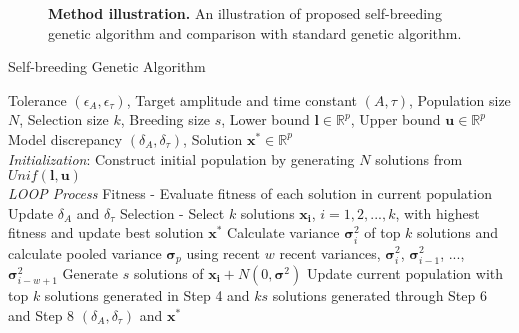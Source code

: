 \documentclass[10pt,letterpaper]{article}
\begin{document}
\begin{figure}[!ht]
    \centering
    \caption{{\bf Method illustration.} 
    An illustration of proposed self-breeding genetic algorithm and comparison with standard genetic algorithm.}
    \label{fig5}
\end{figure}

\begin{algorithm}[!ht]
    \caption{Self-breeding Genetic Algorithm}
    \begin{algorithmic}[1-=0+-*]
        \renewcommand{\algorithmicrequire}{\textbf{Input:}}
        \renewcommand{\algorithmicensure}{\textbf{Output:}}
        \REQUIRE Tolerance $(\epsilon_{A}, \epsilon_{\tau})$, Target amplitude and time constant $(A, \tau)$, Population size $N$, Selection size $k$, Breeding size $s$, Lower bound $\mathbf{l} \in \mathbb{R}^p$, Upper bound $\mathbf{u} \in \mathbb{R}^p$
        \ENSURE Model discrepancy $(\delta_{A}, \delta_{\tau})$, Solution $\mathbf{x}^* \in \mathbb{R}^p$
        \\ \textit{Initialization}:
        \STATE Construct initial population by generating $N$ solutions from $Unif(\mathbf{l}, \mathbf{u})$
        \\ \textit{LOOP Process}
        \STATE Fitness - Evaluate fitness of each solution in current population        
        \STATE Update $\delta_{A}$ and $\delta_{\tau}$
        \STATE Selection - Select $k$ solutions $\mathbf{x_i}$, $i=1,2,...,k$, with highest fitness and update best solution $\mathbf{x^{*}}$
        \STATE Calculate variance $\mathbf{\sigma}^2_{i}$ of top $k$ solutions and calculate pooled variance $\mathbf{\sigma}_{p}$ using recent $w$ recent variances, $\mathbf{\sigma}^2_{i}$, $\mathbf{\sigma}^2_{i-1}$, ..., $\mathbf{\sigma}^2_{i-w+1}$
            \STATE Generate $s$ solutions of $\mathbf{x_i} + N(0,\mathbf{\sigma}^2)$
        \ENDFOR
        \STATE Update current population with top $k$ solutions generated in Step 4 and $ks$ solutions generated through Step 6 and Step 8
        \ENDWHILE
        \RETURN $(\delta_{A}, \delta_{\tau})$ and $\mathbf{x}^*$
    \end{algorithmic}
    \label{alg2}
\end{algorithm}

\end{document}
